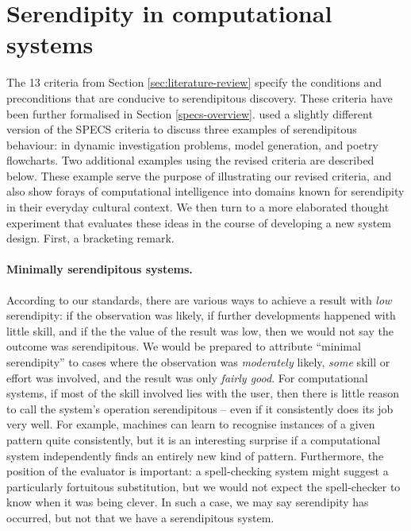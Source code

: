 \section{Serendipity in computational systems} \label{sec:computational-serendipity}

The 13 criteria from Section \ref{sec:literature-review} specify the
conditions and preconditions that are conducive to serendipitous
discovery.  These criteria have been further formalised
in Section \ref{specs-overview}.
% 
 used a slightly different version of the
SPECS criteria to discuss three examples of serendipitous behaviour:
in dynamic investigation problems, model generation, and poetry
flowcharts.  Two additional examples using the revised criteria are
described below.  These example serve the purpose of illustrating our
revised criteria, and also show forays of computational intelligence
into domains known for serendipity in their everyday cultural context.
We then turn to a more elaborated thought experiment that evaluates
these ideas in the course of developing a new system design.  First, a
bracketing remark.

\paragraph{Minimally serendipitous systems.}
According to our standards, there are various ways to achieve a result
with \emph{low} serendipity: if the observation was likely, if further
developments happened with little skill, and if the the value of the
result was low, then we would not say the outcome was serendipitous.
We would be prepared to attribute ``minimal serendipity'' to cases
where the observation was \emph{moderately} likely, \emph{some} skill
or effort was involved, and the result was only \emph{fairly good}.
For computational systems, if most of the skill involved lies with the
user, then there is little reason to call the system's operation
serendipitous -- even if it consistently does its job very well.  For
example, machines can learn to recognise instances of a given pattern
quite consistently, but it is an interesting surprise if a
computational system independently finds an entirely new kind of
pattern.  Furthermore, the position of the evaluator is important: a
spell-checking system might suggest a particularly fortuitous
substitution, but we would not expect the spell-checker to know when
it was being clever.  In such a case, we may say serendipity has
occurred, but not that we have a serendipitous system.

